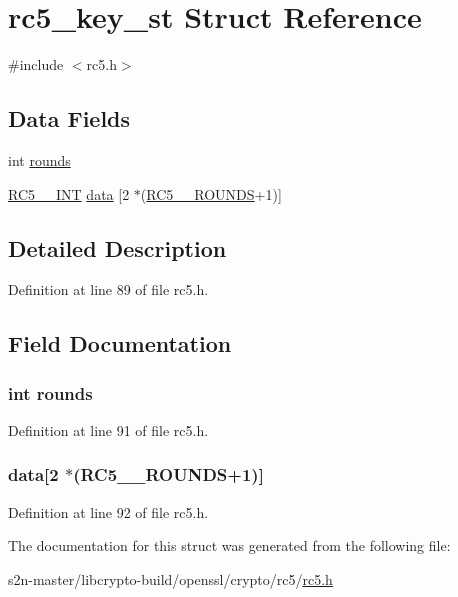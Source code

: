 \hypertarget{structrc5__key__st}{}\section{rc5\+\_\+key\+\_\+st Struct Reference}
\label{structrc5__key__st}


{\ttfamily \#include $<$rc5.\+h$>$}

\subsection*{Data Fields}
\begin{DoxyCompactItemize}
\item 
int \hyperlink{structrc5__key__st_ab951ebd61b5fff7fb5c4212d7fc63254}{rounds}
\item 
\hyperlink{rc5_8h_ab62e736162fb3319500365b7773caf16}{R\+C5\+\_\+\_\+\+I\+NT} \hyperlink{structrc5__key__st_ab5e160d08a8d865c81af1e3c2dcf964b}{data} \mbox{[}2 $\ast$(\hyperlink{rc5_8h_a815213e70b830624d01e9da4954e835d}{R\+C5\+\_\+\_\+\+R\+O\+U\+N\+DS}+1)\mbox{]}
\end{DoxyCompactItemize}


\subsection{Detailed Description}


Definition at line 89 of file rc5.\+h.



\subsection{Field Documentation}
\subsubsection[{\texorpdfstring{rounds}{rounds}}]{\setlength{\rightskip}{0pt plus 5cm}int rounds}\hypertarget{structrc5__key__st_ab951ebd61b5fff7fb5c4212d7fc63254}{}\label{structrc5__key__st_ab951ebd61b5fff7fb5c4212d7fc63254}


Definition at line 91 of file rc5.\+h.

\subsubsection[{\texorpdfstring{data}{data}}]{ data\mbox{[}2 $\ast$({\bf R\+C5\+\_\+\_\+\+R\+O\+U\+N\+DS}+1)\mbox{]}}\hypertarget{structrc5__key__st_ab5e160d08a8d865c81af1e3c2dcf964b}{}\label{structrc5__key__st_ab5e160d08a8d865c81af1e3c2dcf964b}


Definition at line 92 of file rc5.\+h.



The documentation for this struct was generated from the following file\+:\begin{DoxyCompactItemize}
\item 
s2n-\/master/libcrypto-\/build/openssl/crypto/rc5/\hyperlink{rc5_8h}{rc5.\+h}\end{DoxyCompactItemize}
